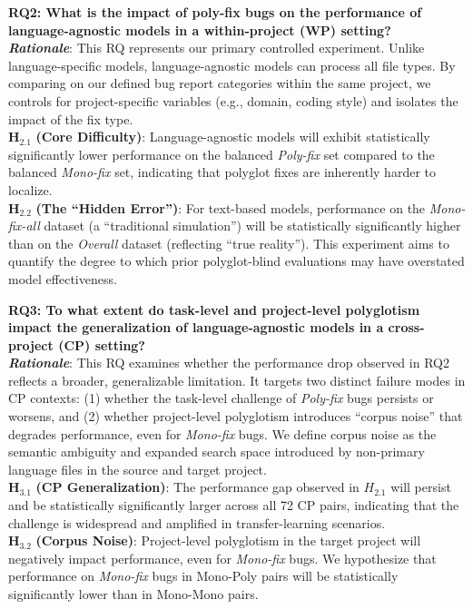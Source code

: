 \documentclass[12pt,table,xcdraw]{article}
\begin{document}
\textbf{RQ2: What is the impact of poly-fix bugs on the performance of language-agnostic models in a within-project (WP) setting?} \\
\textit{\textbf{Rationale}}: This RQ represents our primary controlled experiment. Unlike language-specific models, language-agnostic models can process all file types. By comparing on our defined bug report categories within the same project, we controls for project-specific variables (e.g., domain, coding style) and isolates the impact of the fix type. \\
$\boldsymbol{H_{2.1}}$ \textbf{(Core Difficulty)}: Language-agnostic models will exhibit statistically significantly lower performance on the balanced \textit{Poly-fix} set compared to the balanced \textit{Mono-fix} set, indicating that polyglot fixes are inherently harder to localize.\\
$\boldsymbol{H_{2.2}}$ \textbf{(The ``Hidden Error'')}: For text-based models, performance on the \textit{Mono-fix-all} dataset (a ``traditional simulation'') will be statistically significantly higher than on the \textit{Overall} dataset (reflecting ``true reality''). This experiment aims to quantify the degree to which prior polyglot-blind evaluations may have overstated model effectiveness.

\textbf{RQ3: To what extent do task-level and project-level polyglotism impact the generalization of language-agnostic models in a cross-project (CP) setting?} \\
\textit{\textbf{Rationale}}: This RQ examines whether the performance drop observed in RQ2 reflects a broader, generalizable limitation. It targets two distinct failure modes in CP contexts: (1) whether the task-level challenge of \textit{Poly-fix} bugs persists or worsens, and (2) whether project-level polyglotism introduces ``corpus noise'' that degrades performance, even for \textit{Mono-fix} bugs. We define corpus noise as the semantic ambiguity and expanded search space introduced by non-primary language files in the source and target project.\\
$\boldsymbol{H_{3.1}}$ \textbf{(CP Generalization)}: The performance gap observed in $H_{2.1}$ will persist and be statistically significantly larger across all 72 CP pairs, indicating that the challenge is widespread and amplified in transfer-learning scenarios.\\
$\boldsymbol{H_{3.2}}$ \textbf{(Corpus Noise)}: Project-level polyglotism in the target project will negatively impact performance, even for \textit{Mono-fix} bugs. We hypothesize that performance on \textit{Mono-fix }bugs in Mono-Poly pairs will be statistically significantly lower than in Mono-Mono pairs.
\end{document}
